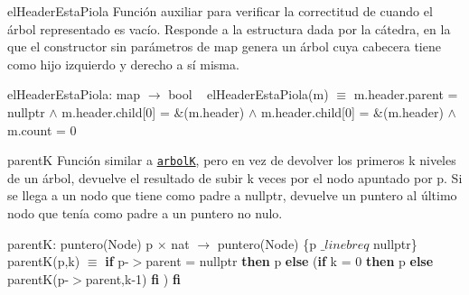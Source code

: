 \begin{DoxyParagraph}{el\+Header\+Esta\+Piola}
Función auxiliar para verificar la correctitud de  cuando el árbol representado es vacío. Responde a la estructura dada por la cátedra, en la que el constructor sin parámetros de map genera un árbol cuya cabecera tiene como hijo izquierdo y derecho a sí misma.

el\+Header\+Esta\+Piola\+: map $\to$ bool ~\newline
el\+Header\+Esta\+Piola(m) $\equiv$ m.\+header.\+parent = nullptr $\land$ m.\+header.\+child\mbox{[}0\mbox{]} = \&(m.\+header) $\land$ m.\+header.\+child\mbox{[}0\mbox{]} = \&(m.\+header) $\land$ m.\+count = 0


\end{DoxyParagraph}
\begin{DoxyParagraph}{parentK}
Función similar a \href{axiomas.html#arbolK}{\tt arbolK}, pero en vez de devolver los primeros k niveles de un árbol, devuelve el resultado de subir k veces por el nodo apuntado por p. Si se llega a un nodo que tiene como padre a nullptr, devuelve un puntero al último nodo que tenía como padre a un puntero no nulo.

parentK\+: puntero(\+Node) p $\times$ nat $\to$ puntero(\+Node) \{p $\_linebr eq$ nullptr\} ~\newline
parent\+K(p,k) $\equiv$ {\bfseries if} p-\/$>$parent = nullptr {\bfseries then} p {\bfseries else} ({\bfseries if} k = 0 {\bfseries then} p {\bfseries else} parentK(p-\/$>$parent,k-\/1) {\bfseries fi} ) {\bfseries fi} 
\end{DoxyParagraph}
